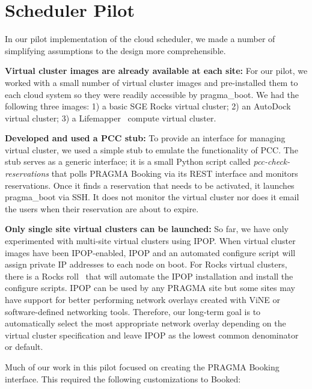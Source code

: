 \documentclass[times]{cpeauth}
\begin{document}
\section{Scheduler Pilot}
\label{Sec:Pilot}

In our pilot implementation of the cloud scheduler, we made a number of simplifying assumptions to the design more comprehensible.

\textbf{Virtual cluster images are already available at each site:}  For our pilot, we worked with a small number of virtual cluster images and pre-installed them to each cloud system so they were readily accessible by pragma\_boot.  We had the following three images: 1) a basic SGE Rocks virtual cluster; 2) an AutoDock virtual cluster;  3) a Lifemapper~\cite{lifemapper} compute virtual cluster.   

\textbf{Developed and used a PCC stub:}  To provide an interface for managing virtual cluster, we used a simple stub to emulate the functionality of PCC.  The stub serves as a generic interface; it is a small Python script called \textit{pcc-check-reservations} that polls PRAGMA Booking via its REST interface and monitors reservations.  Once it finds a reservation that needs to be activated, it launches pragma\_boot via SSH.  It does not  monitor the virtual cluster nor does it email the users when their reservation are about to expire.  

\textbf{Only single site virtual clusters can be launched:}  So far, we have only experimented with multi-site virtual clusters using IPOP.  When virtual cluster images have been IPOP-enabled, IPOP and an automated configure script will assign private IP addresses to each node on boot.  For Rocks virtual clusters, there is a Rocks roll~\cite{ipoproll} that will automate the IPOP installation and install the configure scripts.  IPOP can be used by any PRAGMA site but some sites may have support for better performing network overlays created with ViNE or software-defined networking tools.  Therefore, our long-term goal is to automatically select the most appropriate network overlay depending on the virtual cluster specification and leave IPOP as the lowest common denominator or default.

Much of our work in this pilot focused on creating the PRAGMA Booking interface.  This required the following customizations to Booked:
\end{document}
